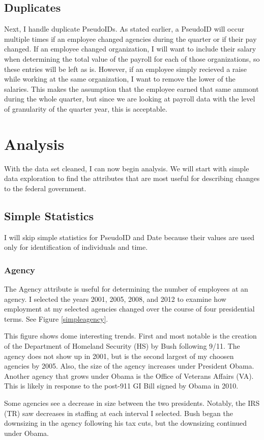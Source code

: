 \documentclass{article}
\begin{document}
    \subsection{Duplicates}
    Next, I handle duplicate PseudoIDs. As stated earlier, a PseudoID will occur multiple times if an employee changed agencies during the quarter or if their pay changed. If an employee changed organization, I will want to include their salary when determining the total value of the payroll for each of those organizations, so these entries will be left as is. However, if an employee simply recieved a raise while working at the same organization, I want to remove the lower of the salaries. This makes the assumption that the employee earned that same ammont during the whole quarter, but since we are looking at payroll data with the level of granularity of the quarter year, this is acceptable.

\section{Analysis}
With the data set cleaned, I can now begin analysis. We will start with simple data exploration to find the attributes that are most useful for describing changes to the federal government.

    \subsection{Simple Statistics}
    I will skip simple statistics for PseudoID and Date because their values are used only for identification of individuals and time.

        \subsubsection{Agency}
        The Agency attribute is useful for determining the number of employees at an agency. I selected the years 2001, 2005, 2008, and 2012 to examine how employment at my selected agencies changed over the course of four presidential terms. See Figure \ref{simpleagency}.
        \par
        This figure shows dome interesting trends. First and most notable is the creation of the Department of Homeland Security (HS) by Bush following 9/11. The agency does not show up in 2001, but is the second largest of my choosen agencies by 2005. Also, the size of the agency increases under President Obama. Another agency that grows under Obama is the Office of Veterans Affairs (VA). This is likely in response to the post-911 GI Bill signed by Obama in 2010.
        \par
        Some agencies see a decrease in size between the two presidents. Notably, the IRS (TR) saw decreases in staffing at each interval I selected. Bush began the downsizing in the agency following his tax cuts, but the downsizing continued under Obama.
\end{document}
